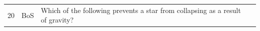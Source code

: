 \documentclass[10pt]{article}
\begin{document}
\begin{tiny}
\begin{longtable}{|r|p{0.375in}|p{1.275in}|p{3.5in}|}
20 &          BoS &                                                                                                                                                                                                   Which of the following prevents a star from collapsing as a result of gravity? &                                                                                                                                                                                                                                                                                                                                                                                                                                                                                                                                                                                                                                                                                                                                                                                                                                                                                                                                                                                                                                                                                                                                                                                                                                                                                                                                                                                                                                                                                                                                                                                                                                                                                                                                                                                                                                                                                                                                                                                                                                                                                                                                                                                                                                                                                                                                                                                                                                                                                                                                                                                                                                                                                                                                                                                                                                                                                                                                                                                                                                                                                               
\end{longtable}
\end{tiny}
\end{document}
